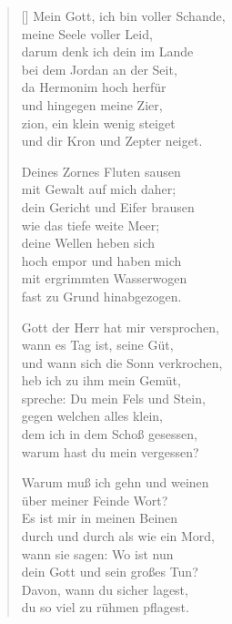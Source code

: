 \begin{multicols}{2}
\begin{verse}[\versewidth]
 Mein Gott, ich bin voller Schande,\\
meine Seele voller Leid,\\
darum denk ich dein im Lande\\
bei dem Jordan an der Seit,\\
da Hermonim hoch herfür\\
und hingegen meine Zier,\\
zion, ein klein wenig steiget\\
und dir Kron und Zepter neiget.

 Deines Zornes Fluten sausen\\
mit Gewalt auf mich daher;\\
dein Gericht und Eifer brausen\\
wie das tiefe weite Meer;\\
deine Wellen heben sich\\
hoch empor und haben mich\\
mit ergrimmten Wasserwogen\\
fast zu Grund hinabgezogen.

 Gott der Herr hat mir versprochen,\\
wann es Tag ist, seine Güt,\\
und wann sich die Sonn verkrochen,\\
heb ich zu ihm mein Gemüt,\\
spreche: Du mein Fels und Stein,\\
gegen welchen alles klein,\\
dem ich in dem Schoß gesessen,\\
warum hast du mein vergessen?

 Warum muß ich gehn und weinen\\
über meiner Feinde Wort?\\
Es ist mir in meinen Beinen\\
durch und durch als wie ein Mord,\\
wann sie sagen: Wo ist nun\\
dein Gott und sein großes Tun?\\
Davon, wann du sicher lagest,\\
du so viel zu rühmen pflagest.
\end{verse}
\end{multicols}

